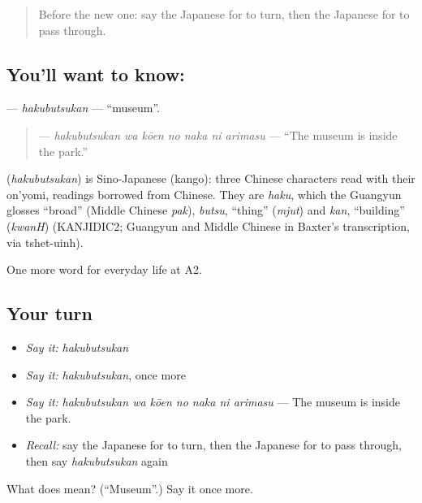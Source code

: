 \label{lesson:JA-C194-hakubutsukan}



\begin{quote}
Before the new one: say the Japanese for to turn, then the Japanese for to pass through.
\end{quote}

\subsection*{You'll want to know: }
\textbf{} — \emph{hakubutsukan} — \textquotedblleft{}museum\textquotedblright{}.

\begin{quote}
\textbf{   } — \emph{hakubutsukan wa kōen no naka ni arimasu} — \textquotedblleft{}The museum is inside the park.\textquotedblright{}
\end{quote}

\begin{cousinweb}
\textbf{} (\emph{hakubutsukan}) is Sino-Japanese (kango): three Chinese characters read with their on'yomi, readings borrowed from Chinese. They are \emph{haku}, which the Guangyun glosses \textquotedblleft{}broad\textquotedblright{} (Middle Chinese \emph{pak}), \emph{butsu}, \textquotedblleft{}thing\textquotedblright{} (\emph{mjut}) and \emph{kan}, \textquotedblleft{}building\textquotedblright{} (\emph{kwanH}) (KANJIDIC2; Guangyun and Middle Chinese in Baxter's transcription, via tshet-uinh).
\end{cousinweb}

\begin{grammarlens}[title={What you've built}]
One more word for everyday life at A2.
\end{grammarlens}

\subsection*{Your turn}
\begin{itemize}
\raggedright
  \item \emph{Say it:} \emph{hakubutsukan}
  \item \emph{Say it:} \emph{hakubutsukan}, once more
  \item \emph{Say it:} \emph{hakubutsukan wa kōen no naka ni arimasu} — The museum is inside the park.
  \item \emph{Recall:} say the Japanese for to turn, then the Japanese for to pass through, then say \emph{hakubutsukan} again
\end{itemize}

\begin{tcolorbox}[breakable,colback=teal!4,colframe=teal!35!black,title={Before you move on}]
What does  mean? (\textquotedblleft{}Museum\textquotedblright{}.) Say it once more.
\end{tcolorbox}
